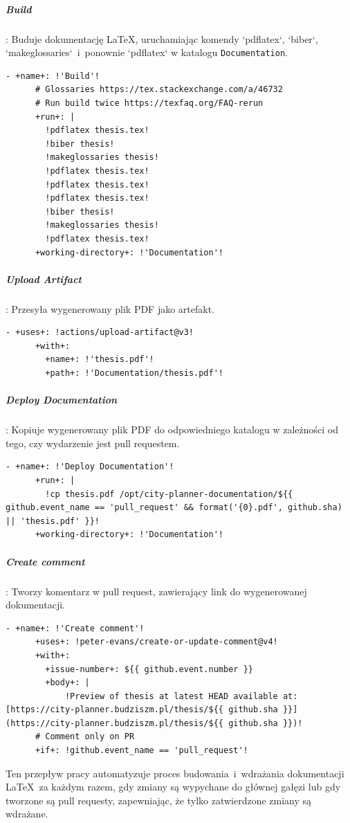 \subparagraph{Build}: Buduje dokumentację \LaTeX , uruchamiając komendy `pdflatex`, `biber`, `makeglossaries`~i~ponownie `pdflatex` w katalogu \texttt{\textcolor{codeblue}{Documentation}}.
\begin{lstlisting}[style=yaml-colored]
    - +name+: !'Build'!
      # Glossaries https://tex.stackexchange.com/a/46732
      # Run build twice https://texfaq.org/FAQ-rerun
      +run+: |
        !pdflatex thesis.tex!
        !biber thesis!
        !makeglossaries thesis!
        !pdflatex thesis.tex!
        !pdflatex thesis.tex!
        !pdflatex thesis.tex!
        !biber thesis!
        !makeglossaries thesis!
        !pdflatex thesis.tex!
      +working-directory+: !'Documentation'!
\end{lstlisting}

\subparagraph{Upload Artifact}: Przesyła wygenerowany plik PDF jako artefakt.
\begin{lstlisting}[style=yaml-colored]
    - +uses+: !actions/upload-artifact@v3!
      +with+:
        +name+: !'thesis.pdf'!
        +path+: !'Documentation/thesis.pdf'!
\end{lstlisting}

\subparagraph{Deploy Documentation}: Kopiuje wygenerowany plik PDF do odpowiedniego katalogu w zależności od tego, czy wydarzenie jest pull requestem.
\begin{lstlisting}[style=yaml-colored]
    - +name+: !'Deploy Documentation'!
      +run+: |
        !cp thesis.pdf /opt/city-planner-documentation/${{ github.event_name == 'pull_request' && format('{0}.pdf', github.sha) || 'thesis.pdf' }}!
      +working-directory+: !'Documentation'!
\end{lstlisting}

\subparagraph{Create comment}: Tworzy komentarz w pull request, zawierający link do wygenerowanej dokumentacji.
\begin{lstlisting}[style=yaml-colored]
    - +name+: !'Create comment'!
      +uses+: !peter-evans/create-or-update-comment@v4!
      +with+:
        +issue-number+: ${{ github.event.number }}
        +body+: |
            !Preview of thesis at latest HEAD available at: [https://city-planner.budziszm.pl/thesis/${{ github.sha }}](https://city-planner.budziszm.pl/thesis/${{ github.sha }})!
      # Comment only on PR
      +if+: !github.event_name == 'pull_request'!
\end{lstlisting}

Ten przepływ pracy automatyzuje proces budowania~i~wdrażania dokumentacji \LaTeX\ za każdym razem, gdy zmiany są wypychane do głównej gałęzi lub gdy tworzone są pull requesty, zapewniając, że tylko zatwierdzone zmiany są wdrażane.

